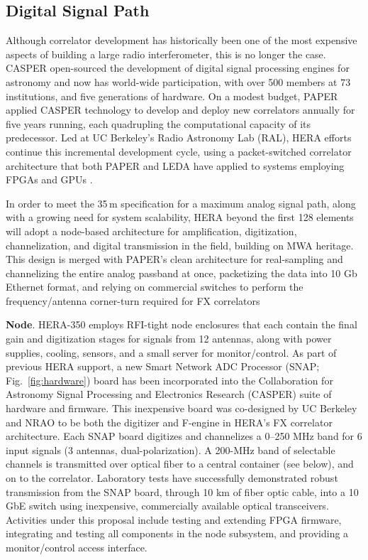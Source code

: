 \documentclass[preprint,11pt]{aastex}
\newcommand{\Mycitep}[1]{\citep{#1}}
\begin{document}
\subsection{Digital Signal Path}
\label{sec:digital}

\noindent Although correlator development has historically been one of the most 
expensive aspects of building a large radio interferometer, this is no longer the case.
CASPER \Mycitep{parsons_et_al2006}
open-sourced the development of digital signal processing engines for astronomy and
now has world-wide participation,
with over 500 members at 73 institutions, and 
five generations of hardware.
On a modest budget, PAPER applied CASPER technology to develop and deploy new correlators
annually for five years running, each quadrupling the computational capacity of its predecessor.
Led at UC Berkeley's Radio Astronomy Lab (RAL),
HERA efforts continue this incremental development cycle, using a packet-switched
correlator architecture \Mycitep{parsons_et_al2008} that both PAPER and LEDA have
applied to systems employing FPGAs and GPUs \citep{clark_et_al2011}.



In order to meet the 35\,m specification for a maximum analog signal path, along with a growing need for system scalability, HERA beyond the first 128 elements will adopt a node-based architecture for amplification, digitization, channelization, and digital
transmission in the field, building on MWA heritage. This design is merged with PAPER's clean 
architecture for real-sampling and channelizing the entire analog passband at once, packetizing the data into
10 Gb Ethernet format, and relying on commercial switches to perform the frequency/antenna corner-turn required for FX correlators

{\bf Node}. HERA-350 employs RFI-tight node enclosures that each contain the final gain and digitization stages for
signals from 12 antennas, along with power supplies, cooling, sensors, and a small server for monitor/control.  
As part of previous HERA support,
a new Smart Network ADC Processor (SNAP; Fig.~\ref{fig:hardware}) board has been incorporated 
into the Collaboration for Astronomy Signal Processing and Electronics Research (CASPER) suite of hardware and firmware. This inexpensive board was co-designed by UC Berkeley and NRAO to be
both the digitizer and F-engine in HERA's FX correlator architecture.
Each SNAP board 
digitizes and channelizes a 0--250 MHz band for 6 input signals (3 antennas, dual-polarization).
A 200-MHz band of selectable channels is transmitted over optical fiber
to a central container (see below), and on to the correlator.  Laboratory
tests have successfully demonstrated robust transmission from the SNAP board, through 10 km of fiber optic cable, 
into a 10 GbE switch using inexpensive, commercially available optical transceivers.
Activities under this proposal include 
testing and extending FPGA firmware,
integrating and testing all components in the node subsystem, and providing a monitor/control
access interface.
\end{document}

